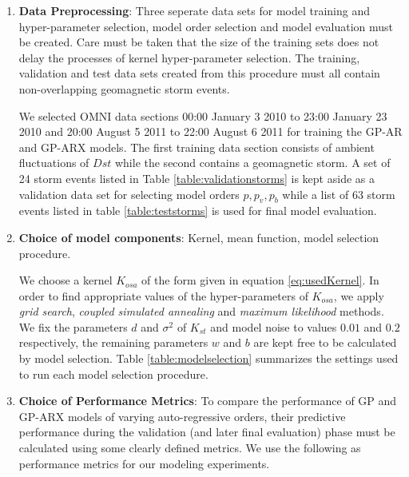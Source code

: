 \documentclass{article}
\begin{document}
\begin{enumerate}

\item \textbf{Data Preprocessing}: Three seperate data sets for model training and hyper-parameter selection, model order selection and model evaluation must be created. Care must be taken that the size of the training sets does not delay the processes of kernel hyper-parameter selection. The training, validation and test data sets created from this procedure must all contain non-overlapping geomagnetic storm events. 

We selected OMNI data sections 00:00 January 3 2010 to 23:00 January 23 2010 and 20:00 August 5 2011 to 22:00 August 6 2011 for training the GP-AR and GP-ARX models. The first training data section consists of ambient fluctuations of $Dst$ while the second contains a geomagnetic storm. A set of 24 storm events listed in Table \ref{table:validationstorms} is kept aside as a validation data set for selecting model orders $p, p_v, p_b$ while a list of 63 storm events listed in table \ref{table:teststorms} is used for final model evaluation.


\item \textbf{Choice of model components}:  Kernel, mean function, model selection procedure. 

We choose a kernel $K_{osa}$ of the form given in equation \ref{eq:usedKernel}. In order to find appropriate values of the hyper-parameters of $K_{osa}$, we apply \emph{grid search}, \emph{coupled simulated annealing} and \emph{maximum likelihood} methods. We fix the parameters $d$ and $\sigma^2$ of $K_{st}$ and model noise to values $0.01$ and $0.2$ respectively, the remaining parameters $w$ and $b$ are kept free to be calculated by model selection. Table \ref{table:modelselection} summarizes the settings used to run each model selection procedure.

\item \textbf{Choice of Performance Metrics}: To compare the performance of GP and GP-ARX models of varying auto-regressive orders, their predictive performance during the validation (and later final evaluation) phase must be calculated using some clearly defined metrics. We use the following as performance metrics for our modeling experiments.


\end{enumerate}
\end{document}
